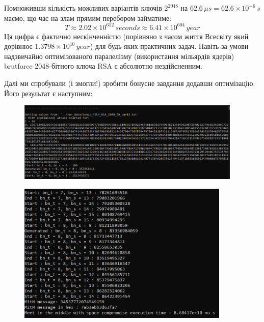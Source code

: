 Помноживши кількість можливих варіантів ключів $2^{2048}$ на $62.6 \, \mu s = 62.6 \times 10^{-6} \, s$ маємо, що час на 
злам прямим перебором займатиме:
\begin{equation*}
    T \approx 2.02 \times 10^{612} \, seconds \approx 6.41 \times 10^{604} \, year
\end{equation*}
Ця цифра є фактично нескінченністю (порівняно з часом життя Всесвіту який дорівнює $1.3798 \times 10^{10} \, year$) для 
будь-яких практичних задач. Навіть за умови надзвичайно оптимізованого паралелізму (використання мільярдів ядерів) 
brutforce 2048-бітного ключа RSA є абсолютно нездійсненним.

\newpage %
Далі ми спробували (і змогли!) зробити бонусне завдання додавши оптимізацію. Його результат є наступним:

\begin{figure}[!ht]
    \centering
    \begin{minipage}{0.95\linewidth}
        \includegraphics[width=0.95\textwidth, scale=1.5]{ReportPic/report_7_MitM_bonus.png}
    \end{minipage}
\end{figure}

\begin{figure}[!ht]
    \centering
    \begin{minipage}{0.9\linewidth}
        \includegraphics[width=0.90\textwidth, scale=1.2]{ReportPic/report_8_MitM_bonus.png}
    \end{minipage}
\end{figure}

